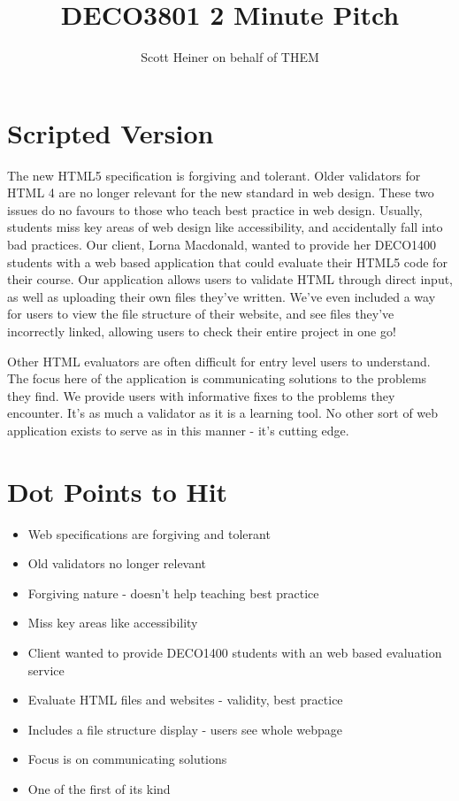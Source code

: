 \documentclass[12pt]{article}
\title{\bf DECO3801 2 Minute Pitch}
\author{Scott Heiner on behalf of THEM}
\date{}
\begin{document}
\maketitle

\section*{Scripted Version}

The new HTML5 specification is forgiving and tolerant. Older validators for HTML 4 are no longer relevant for the new standard in web design. These two issues do no favours to those who teach best practice in web design. Usually, students miss key areas of web design like accessibility, and accidentally fall into bad practices. Our client, Lorna Macdonald, wanted to provide her DECO1400 students with a web based application that could evaluate their HTML5 code for their course. Our application allows users to validate HTML through direct input, as well as uploading their own files they've written. We've even included a way for users to view the file structure of their website, and see files they've incorrectly linked, allowing users to check their entire project in one go!

Other HTML evaluators are often difficult for entry level users to understand. The focus here of the application is communicating solutions to the problems they find. We provide users with informative fixes to the problems they encounter. It's as much a validator as it is a learning tool. No other sort of web application exists to serve as in this manner - it's cutting edge.

\section*{Dot Points to Hit}

\begin{itemize}
\item Web specifications are forgiving and tolerant
\item Old validators no longer relevant
\item Forgiving nature - doesn't help teaching best practice
\item Miss key areas like accessibility
\item Client wanted to provide DECO1400 students with an web based evaluation service
\item Evaluate HTML files and websites - validity, best practice
\item Includes a file structure display - users see whole webpage
\item Focus is on communicating solutions
\item One of the first of its kind
\end{itemize}
\end{document}
